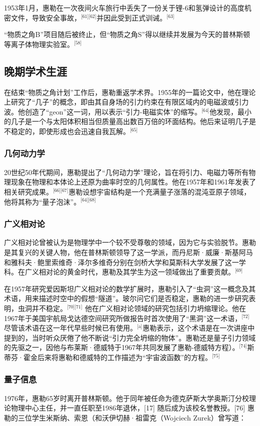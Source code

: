 1953年1月，惠勒在一次夜间火车旅行中丢失了一份关于锂-6和氢弹设计的高度机密文件，导致安全事故，\(^\text{[61][62]}\)并因此受到正式训诫。\(^\text{[63]}\)

“物质之角B”项目随后被终止，但“物质之角S”得以继续并发展为今天的普林斯顿等离子体物理实验室。\(^\text{[58]}\)
\subsection{晚期学术生涯}
在结束“物质之角计划”工作后，惠勒重返学术界。1955年的一篇论文中，他在理论上研究了“几子”的概念，即由其自身场的引力约束在有限区域内的电磁波或引力波。他创造了“geon”这一词，用以表示“引力-电磁实体”的缩写。\(^\text{[64]}\)他发现，最小的几子是一个与太阳体积相当但质量高出数百万倍的环面结构。他后来证明几子是不稳定的，即使形成也会迅速自我瓦解。\(^\text{[65]}\)
\subsubsection{几何动力学}
20世纪50年代期间，惠勒提出了“几何动力学”理论，旨在将引力、电磁力等所有物理现象在物理和本体论上还原为曲率时空的几何属性。他在1957年和1961年发表了相关研究成果。\(^\text{[66][67]}\)惠勒设想宇宙结构是一个充满量子涨落的混沌亚原子领域，他将其称为“量子泡沫”。\(^\text{[64][68]}\)
\subsubsection{广义相对论}
广义相对论曾被认为是物理学中一个较不受尊敬的领域，因为它与实验脱节。惠勒是其复兴的关键人物，他在普林斯顿领导了这一学派，而丹尼斯·威廉·斯基阿马和雅科夫·鲍里索维奇·泽尔多维奇分别在剑桥大学和莫斯科大学发展了这一学科。在广义相对论的黄金时代，惠勒及其学生为这一领域做出了重要贡献。\(^\text{[69]}\)

在1957年研究爱因斯坦广义相对论的数学扩展时，惠勒引入了“虫洞”这一概念及其术语，用来描述时空中的假想“隧道”。玻尔问它们是否稳定，惠勒的进一步研究表明，虫洞并不稳定。\(^\text{[70][71]}\) 他在广义相对论领域的研究包括引力坍缩理论。他在1967年于美国宇航局戈达德空间研究所做报告时首次使用了“黑洞”这一术语，\(^\text{[72]}\)尽管该术语在这一年代早些时候已有使用。\(^\text{[a]}\)惠勒表示，这个术语是在一次讲座中提到的，当时听众厌倦了他不断说“引力完全坍缩的物体”。惠勒还是量子引力领域的先驱之一，因他与布莱斯·德威特于1967年共同发展了惠勒-德威特方程）。\(^\text{[74]}\)斯蒂芬·霍金后来将惠勒和德威特的工作描述为“宇宙波函数”的方程。\(^\text{[75]}\)
\subsubsection{量子信息}
1976年，惠勒65岁时离开普林斯顿。他于同年被任命为德克萨斯大学奥斯汀分校理论物理中心主任，并一直任职至1986年退休，[17] 随后成为该校名誉教授。[76] 惠勒的三位学生米斯纳、索恩（和沃伊切赫·祖雷克（Wojciech Zurek）曾写道：

